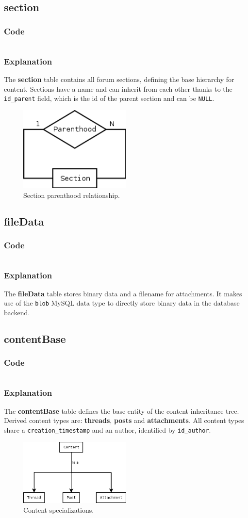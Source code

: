 \documentclass[12pt]{report}
\renewcommand\emph{\textbf}
\newcommand{\printSQLtest}[1]
{
    \inputminted[linenos, breaklines, breakbytoken, tabsize=4, fontsize=\footnotesize]{mysql}{#1}
}
\newcommand{\printSQLTablepage}[2]
{
    \newpage
    \subsection{#2}
    \subsubsection{Code}
    \printSQLtest{../sql/parts/#1}
    \subsubsection{Explanation}
}
\begin{document}
                \printSQLTablepage{05_tblSection.sql}{section}
                    The \emph{section} table contains all forum sections, defining the base hierarchy for content. Sections have a name and can inherit from each other thanks to the \texttt{id_parent} field, which is the id of the parent section and can be \texttt{NULL}.

                    \begin{figure}[h]
                    \caption{Section parenthood relationship.}
                    \centering
                    \includegraphics[width=0.5\textwidth]{td/05section}
                    \end{figure}

                \printSQLTablepage{06_tblFileData.sql}{fileData}
                    The \emph{fileData} table stores binary data and a filename for attachments. It makes use of the \texttt{blob} MySQL data type to directly store binary data in the database backend.

                \printSQLTablepage{07_tblContentBase.sql}{contentBase}
                    The \emph{contentBase} table defines the base entity of the content inheritance tree. Derived content types are: \emph{threads}, \emph{posts} and \emph{attachments}.
                    All content types share a \texttt{creation_timestamp} and an author, identified by \texttt{id_author}.

                    \begin{figure}[h]
                    \caption{Content specializations.}
                    \centering
                    \includegraphics[width=0.5\textwidth]{td/07contentbase}
                    \end{figure}
\end{document}
